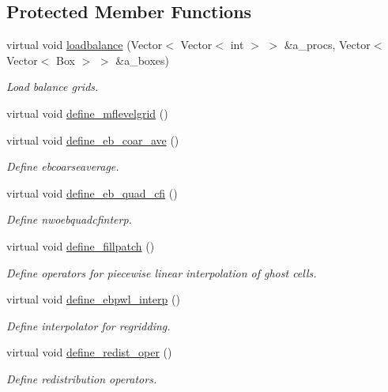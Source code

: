 \subsection*{Protected Member Functions}
\begin{DoxyCompactItemize}
\item 
virtual void \hyperlink{classamr__mesh_a51887cbf3ef346f299b0aa12dce45882}{loadbalance} (Vector$<$ Vector$<$ int $>$ $>$ \&a\+\_\+procs, Vector$<$ Vector$<$ Box $>$ $>$ \&a\+\_\+boxes)
\begin{DoxyCompactList}\small\item\em Load balance grids. \end{DoxyCompactList}\item 
virtual void \hyperlink{classamr__mesh_a2bbd81bc0cfd3f228b8a6251a5bf0d9c}{define\+\_\+mflevelgrid} ()
\item 
virtual void \hyperlink{classamr__mesh_ae8f7db0b1205c0d6071d70ff3fe20883}{define\+\_\+eb\+\_\+coar\+\_\+ave} ()
\begin{DoxyCompactList}\small\item\em Define ebcoarseaverage. \end{DoxyCompactList}\item 
virtual void \hyperlink{classamr__mesh_a93f085fe9534dd8b0ca5ffcadc2042d8}{define\+\_\+eb\+\_\+quad\+\_\+cfi} ()
\begin{DoxyCompactList}\small\item\em Define nwoebquadcfinterp. \end{DoxyCompactList}\item 
virtual void \hyperlink{classamr__mesh_aba100ffc10a609f98d6add5170458f0f}{define\+\_\+fillpatch} ()
\begin{DoxyCompactList}\small\item\em Define operators for piecewise linear interpolation of ghost cells. \end{DoxyCompactList}\item 
virtual void \hyperlink{classamr__mesh_ae9630d0df869d2dea8799798b66c926c}{define\+\_\+ebpwl\+\_\+interp} ()
\begin{DoxyCompactList}\small\item\em Define interpolator for regridding. \end{DoxyCompactList}\item 
virtual void \hyperlink{classamr__mesh_adea296dfeb59e69985a75813862aee5d}{define\+\_\+redist\+\_\+oper} ()
\begin{DoxyCompactList}\small\item\em Define redistribution operators. \end{DoxyCompactList}\item 

\end{DoxyCompactItemize}
